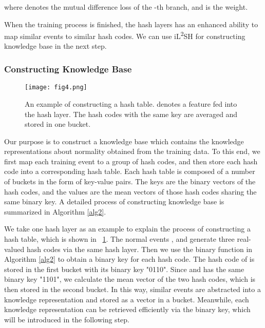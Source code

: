 \documentclass[lettersize,journal]{IEEEtran}
\begin{document}
where  denotes the mutual difference loss of the -th branch, and  is the weight.

When the training process is finished, the hash layers has an enhanced ability to map similar events to similar hash codes.
We can use iL\textsuperscript{2}SH for constructing knowledge base in the next step.

\subsubsection{Constructing Knowledge Base}
\begin{figure}[!t]
	\centering
	\texttt{[image: fig4.png]}
	\caption{An example of constructing a hash table.  denotes a feature fed into the hash layer. The hash codes with the same key are averaged and stored in one bucket.}
	\label{fig4}
\end{figure}

Our purpose is to construct a knowledge base which contains the knowledge representations about normality obtained from the training data.
To this end, we first map each training event to a group of hash codes, and then store each hash code into a corresponding hash table.
Each hash table is composed of a number of buckets in the form of key-value pairs.
The keys are the binary vectors of the hash codes, and the values are the mean vectors of those hash codes sharing the same binary key.
A detailed process of constructing knowledge base is summarized in Algorithm \ref{alg2}.

We take one hash layer as an example to explain the process of constructing a hash table, which is shown in \figurename~\ref{fig4}.
The normal events ,  and  generate three real-valued hash codes via the same hash layer.
Then we use the binary function in Algorithm \ref{alg2} to obtain a binary key for each hash code.
The hash code of  is stored in the first bucket with its binary key "0110".
Since  and  has the same binary key "1101", we calculate the mean vector of the two hash codes, which is then stored in the second bucket.
In this way, similar events are abstracted into a knowledge representation and stored as a vector in a bucket.
Meanwhile, each knowledge representation can be retrieved efficiently via the binary key, which will be introduced in the following step.
\end{document}
